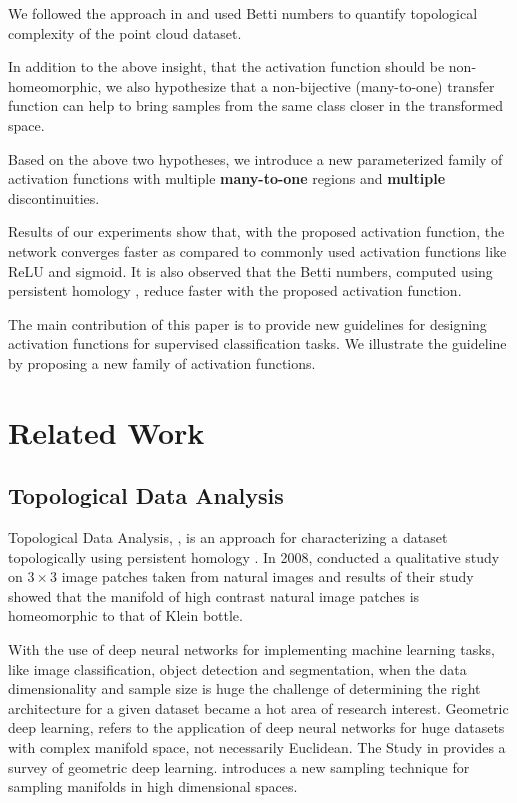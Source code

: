 \documentclass[wcp]{jmlr}
\begin{document}
We followed the approach in \cite{naitzat2020topology} and used Betti numbers to quantify  topological complexity of the point cloud dataset.

In addition to the above insight, that the activation function should be non-homeomorphic, we also hypothesize that a non-bijective (many-to-one) transfer function can help to bring samples from the same class closer in the transformed space.

Based on the above two  hypotheses, we introduce a new parameterized family of activation functions with multiple \textbf{many-to-one} regions and \textbf{multiple} discontinuities.

Results of our experiments show that, with the proposed activation function, the network converges faster as compared to commonly used activation functions like ReLU and sigmoid. It is also observed that the Betti numbers, computed using persistent homology \cite{naitzat2020topology}, reduce faster with the proposed activation function.

The main contribution of this paper is to provide new guidelines for designing  activation functions for supervised classification tasks. We illustrate the guideline by proposing a new family of activation functions.

\section{Related Work}
\subsection{Topological Data Analysis}
Topological Data Analysis, \cite{chazal2021introduction, smith2021topological}, is an approach for characterizing a dataset topologically using persistent homology \cite{edelsbrunner2008persistent}. In 2008, \cite{carlsson2008local} conducted a qualitative study on  $3\times3$ image patches taken from natural images and  results of their study showed that the manifold of  high contrast natural image patches is homeomorphic to that of Klein bottle.

With the use of deep neural networks for implementing machine learning tasks, like image classification, object detection and segmentation, when the data dimensionality and sample size is huge the challenge of determining the right architecture for a given dataset became a hot area of research interest. Geometric deep learning, refers to the application of deep neural networks for huge datasets with complex manifold space, not necessarily Euclidean. The Study in  \cite{bronstein2017geometric} provides a  survey of geometric deep learning.  \cite{saucan2007geometric} introduces a new sampling technique for sampling manifolds in high dimensional spaces.
\end{document}
